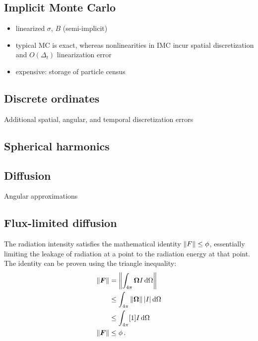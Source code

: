 \subsection{Implicit Monte Carlo}

\begin{itemize}
  \item linearized $\sigma$, $B$ (semi-implicit)
  \item typical MC is exact, whereas nonlinearities in IMC incur spatial
    discretization and $O(\Delta_t)$ linearization error
  \item expensive: storage of particle census
\end{itemize}

\subsection{Discrete ordinates}

Additional spatial, angular, and temporal discretization errors

\subsection{Spherical harmonics}
\cite{Ols2000,McC2008a}

\subsection{Diffusion}\label{sec:diffusion}

Angular approximations

\subsection{Flux-limited diffusion}\label{sec:fldBackground}

The radiation intensity satisfies the mathematical identity $\left\| F \right\| \le \phi$,
essentially limiting the leakage of radiation at a point to the radiation
energy at that point. The identity can be proven using the triangle inequality:
\begin{align*}
  \left\| \bm{F} \right\| &= \left\|  \int_{4\pi} \bm{\Omega} I \mathop{}\!\mathrm{d} \Omega \right\|
  \\&\le \int_{4\pi} \left\| \bm{\Omega} \right\| \left| I \right| \mathop{}\!\mathrm{d} \Omega 
  \\
  &\le \int_{4\pi} [1] I \mathop{}\!\mathrm{d}\Omega
  \\
  \left\| \bm{F} \right\| &\le \phi\,.
\end{align*}

